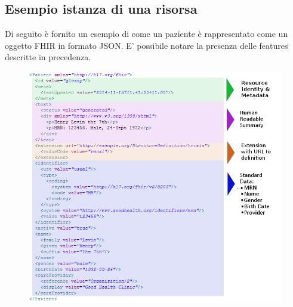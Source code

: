 \documentclass{article}
\begin{document}
\subsection{Esempio istanza di una risorsa}
Di seguito è fornito un esempio di come un paziente è rappresentato come un oggetto FHIR in formato JSON.
E' possibile notare la presenza delle features descritte in precedenza.
\begin{figure}[H]
    \centering
    \includegraphics[width=1.35 \textwidth]{figures/esempio paziente.png}
    \label{fig:esempioPaziente}
\end{figure}
\end{document}
